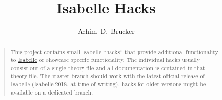 \documentclass[10pt,DIV16,a4paper,abstract=true,twoside=semi,openright]
{scrreprt}
\title{Isabelle Hacks}
\author{Achim~D.~Brucker}%
\begin{document}
  \maketitle
  \begin{abstract}
    \begin{quote}
      This project contains small Isabelle ``hacks'' that provide additional
      functionality to \href{https://isabelle.in.tum.de}{Isabelle} or showcase
      specific functionality. The individual hacks usually consist out of 
      a single theory file and all documentation is contained in that 
      theory file. The master branch should work with the latest official 
      release of Isabelle (Isabelle 2018, at time of writing), hacks for 
      older versions might be available on a dedicated branch.

    \end{quote}
  \end{abstract}


\tableofcontents
\cleardoublepage


\end{document}
